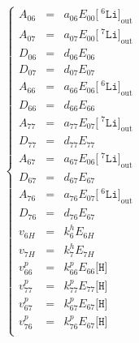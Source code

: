 \documentclass[aps,onecolumn,11pt]{revtex4}
\newcommand{\mychem}[1]{\mathtt{#1}}
\newcommand{\myconc}[1]{\big[#1\big]}
\newcommand{\spLi}[1]{{\!~^{#1}\mychem{Li}}}
\newcommand{\Li}[1]{\myconc{\spLi{#1}}}
\newcommand{\spproton}{\mychem{H}}
\newcommand{\proton}{\myconc{\spproton}}
\newcommand{\myout}[1]{{#1}_{\mathrm{out}}}
\newcommand{\LiOut}[1]{\myout{\Li{#1}}}
\begin{document}
\begin{equation}
\left\lbrace
\begin{array}{rcl}%
A_{06}   & = & a_{06} E_{00} \LiOut{6}  \\%
A_{07}   & = & a_{07} E_{00} \LiOut{7}  \\%
D_{06}   & = & d_{06} E_{06}            \\%
D_{07}   & = & d_{07} E_{07}            \\%
A_{66}   & = & a_{66} E_{06} \LiOut{6}  \\%
D_{66}   & = & d_{66} E_{66}            \\%
A_{77}   & = & a_{77} E_{07} \LiOut{7}  \\%
D_{77}   & = & d_{77} E_{77}            \\%
A_{67}   & = & a_{67} E_{06} \LiOut{7}  \\%
D_{67}   & = & d_{67} E_{67}            \\%
A_{76}   & = & a_{76} E_{07} \LiOut{6}  \\%
D_{76}   & = & d_{76} E_{67}            \\%
v_{6H}   & = & k^h_6 E_{6H}             \\%
v_{7H}   & = & k^h_7 E_{7H}             \\%
v^p_{66} & = & k^p_{66} E_{66} \proton  \\%
v^p_{77} & = & k^p_{77} E_{77} \proton  \\%
v^p_{67} & = & k^p_{67} E_{67} \proton  \\%
v^p_{76} & = & k^p_{76} E_{67} \proton  \\%
\end{array}
\right.
\end{equation}
\end{document}
